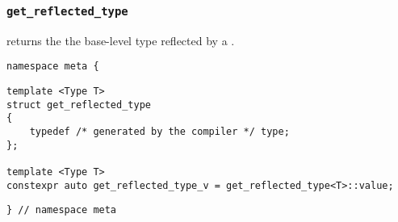 

\subsubsection{\texttt{get\_reflected\_type}}

returns the the base-level type reflected by a .

\begin{verbatim}
namespace meta {
\end{verbatim}
\begin{verbatim}
template <Type T>
struct get_reflected_type
{
	typedef /* generated by the compiler */ type;
};
	
template <Type T>
constexpr auto get_reflected_type_v = get_reflected_type<T>::value;
\end{verbatim}
\begin{verbatim}
} // namespace meta
\end{verbatim}

